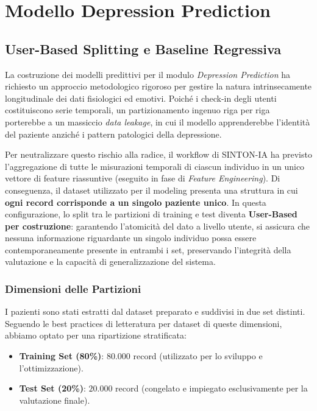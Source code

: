 \section{Modello Depression Prediction}
\label{sec:mod_depression}

\subsection{User-Based Splitting e Baseline Regressiva}

La costruzione dei modelli predittivi per il modulo \textit{Depression Prediction} ha richiesto un approccio metodologico rigoroso per gestire la natura intrinsecamente longitudinale dei dati fisiologici ed emotivi. Poiché i check-in degli utenti costituiscono serie temporali, un partizionamento ingenuo riga per riga porterebbe a un massiccio \textit{data leakage}, in cui il modello apprenderebbe l'identità del paziente anziché i pattern patologici della depressione.

Per neutralizzare questo rischio alla radice, il workflow di SINTON-IA ha previsto l'aggregazione di tutte le misurazioni temporali di ciascun individuo in un unico vettore di feature riassuntive (eseguito in fase di \textit{Feature Engineering}). Di conseguenza, il dataset utilizzato per il modeling presenta una struttura in cui \textbf{ogni record corrisponde a un singolo paziente unico}. In questa configurazione, lo split tra le partizioni di training e test diventa \textbf{User-Based per costruzione}: garantendo l'atomicità del dato a livello utente, si assicura che nessuna informazione riguardante un singolo individuo possa essere contemporaneamente presente in entrambi i set, preservando l'integrità della valutazione e la capacità di generalizzazione del sistema.

\subsubsection*{Dimensioni delle Partizioni}
I pazienti sono stati estratti dal dataset preparato e suddivisi in due set distinti. Seguendo le best practices di letteratura per dataset di queste dimensioni, abbiamo optato per una ripartizione stratificata:
\begin{itemize}
    \item \textbf{Training Set (80\%)}: $80.000$ record (utilizzato per lo sviluppo e l'ottimizzazione).
    \item \textbf{Test Set (20\%)}: $20.000$ record (congelato e impiegato esclusivamente per la valutazione finale).
\end{itemize}

